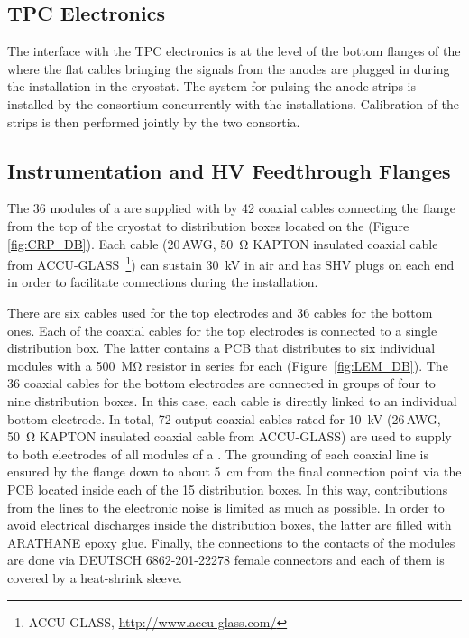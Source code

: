 \subsection{TPC Electronics}
\label{sec:fddp-crp-intfc-elec}

The interface with the \dual TPC electronics is at the level of the bottom flanges of the  where the flat cables bringing the signals from the anodes are plugged in during the  installation in the cryostat. The system for %
pulsing the anode strips is installed by the  consortium %
concurrently with the  installations. %
Calibration of the strips is then performed jointly by the two consortia.

\subsection{Instrumentation and HV Feedthrough Flanges}
\label{sec:fddp-crp-intfc-FT}
The \num{36}  modules of a  are supplied with  by \num{42} coaxial cables 
connecting the \fdth flange from the top of the cryostat to distribution boxes located on the  (Figure \ref{fig:CRP_DB}). Each cable (\num{20}\,AWG, \SI{50}{\ohm} KAPTON insulated coaxial cable from ACCU-GLASS~\footnote{ACCU-GLASS\texttrademark{}, \url{http://www.accu-glass.com/}}) can sustain \SI{30}{kV} in air and has SHV plugs on each end in order to facilitate connections during the  installation.


There are six cables used for the  top electrodes and \num{36} cables for the bottom ones. Each of the coaxial cables for the  top electrodes is connected to a single distribution box. The latter contains a PCB that %
distributes  to six individual  modules with a \SI{500}{\mega\ohm} resistor in series for each 
 (Figure~\ref{fig:LEM_DB}). The \num{36} coaxial cables for the  bottom electrodes are connected in groups of four to nine distribution boxes. In this case, each  cable is directly linked to an individual  bottom electrode. In total, \num{72} output coaxial cables rated for \SI{10}{kV} (\num{26}\,AWG, \SI{50}{\ohm} KAPTON insulated coaxial cable from ACCU-GLASS) are used to supply  to both electrodes of all  modules of a . The grounding of each coaxial line is ensured by the \fdth flange down to about \SI{5}{cm} from the  final connection point via the PCB located inside each of the \num{15} distribution boxes. In this way, contributions from the  lines to the electronic noise is limited as much as possible. In order to avoid electrical discharges inside the distribution boxes, the latter are filled with ARATHANE epoxy glue. Finally, the connections to the  contacts of the  modules are done via  DEUTSCH 6862-201-22278 female connectors and each of them is covered by a heat-shrink sleeve. 

